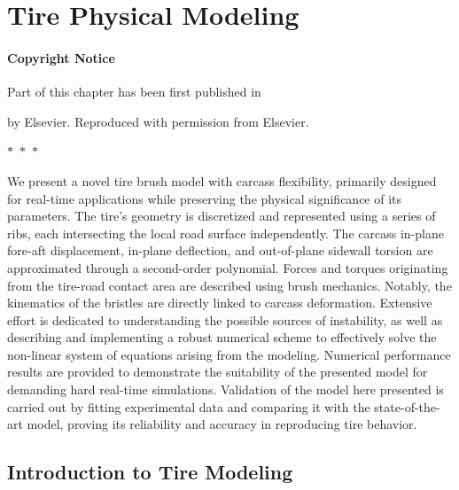 
\chapter{Tire Physical Modeling}
\label{app3:tire_physical_model}

\subsubsection*{Copyright Notice}
Part of this chapter has been first published in
%
\begin{center}
  \begin{minipage}{0.9\textwidth}
  \end{minipage}
\end{center}
%
by Elsevier. Reproduced with permission from Elsevier.

\begin{center}
  $\ast$~$\ast$~$\ast$
\end{center}

We present a novel tire brush model with carcass flexibility, primarily designed for real-time applications while preserving the physical significance of its parameters. The tire's geometry is discretized and represented using a series of ribs, each intersecting the local road surface independently. The carcass in-plane fore-aft displacement, in-plane deflection, and out-of-plane sidewall torsion are approximated through a second-order polynomial. Forces and torques originating from the tire-road contact area are described using brush mechanics. Notably, the kinematics of the bristles are directly linked to carcass deformation. Extensive effort is dedicated to understanding the possible sources of instability, as well as describing and implementing a robust numerical scheme to effectively solve the non-linear system of equations arising from the modeling. Numerical performance results are provided to demonstrate the suitability of the presented model for demanding hard real-time simulations.   Validation of the model here presented is carried out by fitting experimental data and comparing it with the state-of-the-art \MagicFormulae{} model, proving its reliability and accuracy in reproducing tire behavior.


\section{Introduction to Tire Modeling}
\label{app3:sec:introduction}

